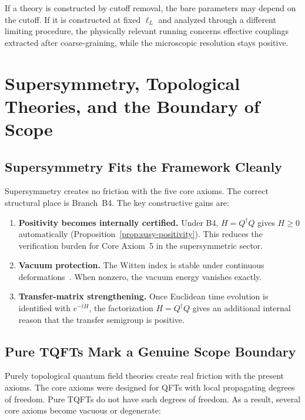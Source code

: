 \documentclass[12pt,a4paper]{article}
\theoremstyle{plain}
\theoremstyle{definition}
\theoremstyle{remark}
\begin{document}
If a theory is constructed by cutoff removal, the bare parameters may
depend on the cutoff. If it is constructed at fixed $\ell_L$ and
analyzed through a different limiting procedure, the physically
relevant running concerns effective couplings extracted after
coarse-graining, while the microscopic resolution stays positive.


\section{Supersymmetry, Topological Theories, and the Boundary of Scope}
\label{sec:susy}

\subsection{Supersymmetry Fits the Framework Cleanly}

Supersymmetry creates no friction with the five core axioms. The
correct structural place is Branch~B4. The key constructive gains are:

\begin{enumerate}[nosep]
\item \textbf{Positivity becomes internally certified.} Under B4,
  $H = Q^\dagger Q$ gives $H \ge 0$ automatically
  (Proposition~\ref{prop:susy-positivity}). This reduces the
  verification burden for Core Axiom~5 in the supersymmetric sector.
\item \textbf{Vacuum protection.} The Witten index is stable under
  continuous deformations~\cite{Witten}. When nonzero, the vacuum
  energy vanishes exactly.
\item \textbf{Transfer-matrix strengthening.} Once Euclidean time
  evolution is identified with $e^{-tH}$, the factorization
  $H = Q^\dagger Q$ gives an additional internal reason that the
  transfer semigroup is positive.
\end{enumerate}


\subsection{Pure TQFTs Mark a Genuine Scope Boundary}\label{sec:tqft}

Purely topological quantum field theories create real friction with
the present axioms. The core axioms were designed for QFTs with local
propagating degrees of freedom. Pure TQFTs do not have such degrees
of freedom. As a result, several core axioms become vacuous or
degenerate:
\end{document}
